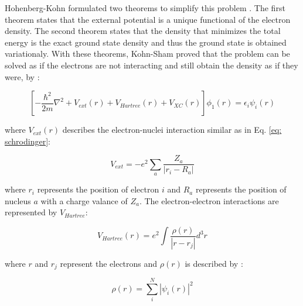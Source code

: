 Hohenberg-Kohn formulated two theorems to simplify this problem \cite{Hohenberg1964}. The first theorem states that the external potential is a unique functional of the electron density. The second theorem states that the density that minimizes the total energy is the exact ground state density and thus the ground state is obtained variationaly. With these theorems, Kohn-Sham proved that the problem can be solved as if the electrons are not interacting and still obtain the density as if they were, by \cite{Kohn1965}:
 
  \begin{equation}
 \label{eq: kohnsham}
\left[ -\frac{\hbar^2}{2m} \nabla^{2} + V_{ext} (r) + V_{Hartree}(r) + V_{XC} (r) \right] \phi_{1}(r) = \epsilon_{i} \psi_{i}(r)
 \end{equation}
 
 \noindent where $V_{ext}(r)$ describes the electron-nuclei interaction similar as in Eq. \ref{eq: schrodinger}:

\begin{equation}
\label{eq: vext}
V_{ext} = - e^2 \sum_{a} \frac {Z_{a}}{|r_i - R_a|}
\end{equation}

\noindent where $r_i$ represents the position of electron $i$ and $R_a$ represents the position of nucleus $a$ with a charge valance of $Z_a$. The electron-electron interactions are represented by $V_{Hartree}$:

\begin{equation}
\label{eq: vhartree}
V_{Hartree} (r) = e^{2} \int \frac {\rho(r)}{|r - r_{j}|} d^3r
\end{equation}

\noindent where $r$ and $r_j$ represent the electrons and $\rho (r)$ is described by :

\begin{equation}
\label{eq: rhop}
\rho (r) = \sum_{i}^N | \psi_{i} (r) |^2
\end{equation}

